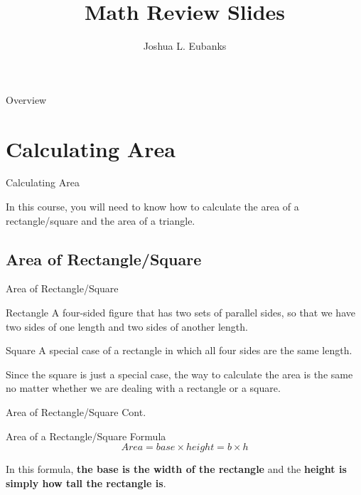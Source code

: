 \documentclass{beamer}
\title[Math Review Slides]{Math Review Slides}
\author{Joshua L. Eubanks}
\date{\vspace{-8cm}}
\begin{document}
\begin{frame}
  \titlepage
\end{frame}

\begin{frame}{Overview}
\tableofcontents
\end{frame}

\section{Calculating Area}

\begin{frame}{Calculating Area}

In this course, you will need to know how to calculate the area of a rectangle/square and the area of a triangle.

\end{frame}

\subsection{Area of Rectangle/Square}
\begin{frame}{Area of Rectangle/Square} 

  \begin{block}{Rectangle}
  A four-sided figure that has two sets of parallel sides, so that we have two sides of one length and two sides of another length.
  \end{block}

  \begin{block}{Square}
    A special case of a rectangle in which all four sides are the same length.
  \end{block}

Since the square is just a special case, the way to calculate the area is the same no matter whether we are dealing with a rectangle or a square.

\end{frame}

\begin{frame}{Area of Rectangle/Square Cont.}
  
  \begin{block}{Area of a Rectangle/Square Formula}
    $$Area = base \times height = b \times h$$

  \end{block}


In this formula, \textbf{the base is the width of the rectangle} and the \textbf{height is simply how tall the rectangle is}.


\end{frame}
\end{document}
